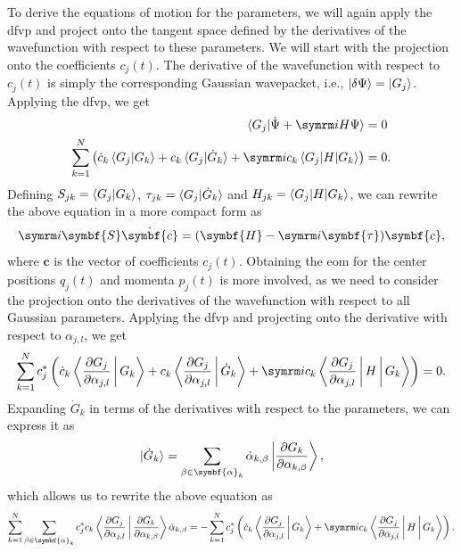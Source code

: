 To derive the equations of motion for the parameters, we will again apply the \gls{dfvp} and project onto the tangent space defined by the derivatives of the wavefunction with respect to these parameters. We will start with the projection onto the coefficients $c_j(t)$. The derivative of the wavefunction with respect to $c_j(t)$ is simply the corresponding Gaussian wavepacket, i.e., $\ket{\delta\Psi}=\ket{G_j}$. Applying the \gls{dfvp}, we get
\begin{align}
\braket{G_j|\dot\Psi+\i H\Psi}&=0\\
\sum_{k=1}^N\left(\dot c_k\braket{G_j|G_k}+c_k\braket{G_j|\dot G_k}+\i c_k\braket{G_j|H|G_k}\right)&=0.
\end{align}
Defining $S_{jk}=\braket{G_j|G_k}$, $\tau_{jk}=\braket{G_j|\dot G_k}$ and $H_{jk}=\braket{G_j|H|G_k}$, we can rewrite the above equation in a more compact form as
\begin{equation}
\i\symbf{S}\dot{\symbf{c}}=(\symbf{H}-\i\symbf{\tau})\symbf{c},
\end{equation}
where $\symbf{c}$ is the vector of coefficients $c_j(t)$. Obtaining the \gls{eom} for the center positions $q_j(t)$ and momenta $p_j(t)$ is more involved, as we need to consider the projection onto the derivatives of the wavefunction with respect to all Gaussian parameters. Applying the \gls{dfvp} and projecting onto the derivative with respect to $\alpha_{j,l}$, we get
\begin{equation}
\sum_{k=1}^Nc_j^\ast\left(\dot c_k\Braket{\frac{\partial G_j}{\partial\alpha_{j,l}}|G_k}+c_k\Braket{\frac{\partial G_j}{\partial \alpha_{j,l}}|\dot G_k}+\i c_k\Braket{\frac{\partial G_j}{\partial \alpha_{j,l}}|H|G_k}\right)=0.
\end{equation}
Expanding $\dot G_k$ in terms of the derivatives with respect to the parameters, we can express it as
\begin{equation}
\ket{\dot G_k}=\sum_{\beta\in\symbf{\alpha}_k}\dot\alpha_{k,\beta}\Ket{\frac{\partial G_k}{\partial \alpha_{k,\beta}}},
\end{equation}
which allows us to rewrite the above equation as
\begin{equation}
\sum_{k=1}^N\sum_{\beta\in\symbf{\alpha}_k}c_j^\ast c_k\Braket{\frac{\partial G_j}{\partial\alpha_{j,l}}|\frac{\vphantom{G_j}\partial G_k}{\partial\alpha_{k,\beta}}}\dot\alpha_{k,\beta}=-\sum_{k=1}^Nc_j^\ast\left(\dot c_k\Braket{\frac{\partial G_j}{\partial\alpha_{j,l}}|G_k}+\i c_k\Braket{\frac{\partial G_j}{\partial\alpha_{j,l}}|H|G_k}\right).
\end{equation}

